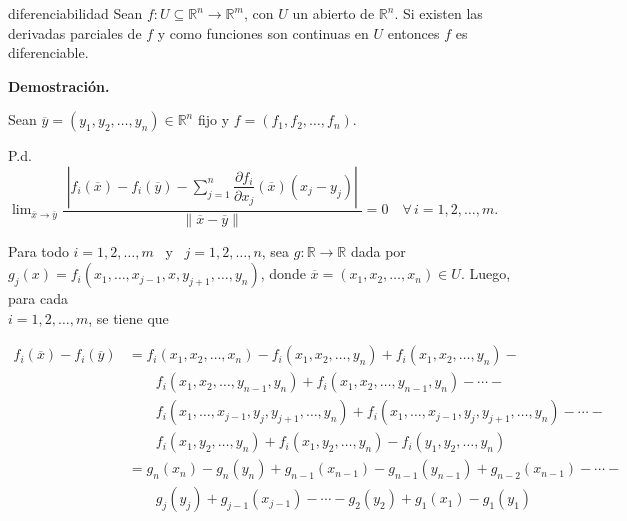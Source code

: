 \documentclass[12pt]{article}
\author{Osmar Dominique Santana Reyes}
\date{\today}
\newenvironment{ejercicio}[1]{\begin{ejer}[breakable, pad at break = 5mm, leftrule = 0.7mm, rightrule = 0.7mm, right = 2mm, left = 2mm, enlarge bottom finally by = 3mm, fontlower = \setlength{\parskip}{2mm}]{}{#1}}{\end{ejer}}
\newcommand{\real}{\mathbb{R}}
\begin{document}
	\begin{ejercicio}{diferenciabilidad}
		Sean $ f: U \subseteq \real^n \to \real^m $, con $ U $ un abierto de $ \real^n $. Si existen las derivadas parciales de $ f $ y como funciones son continuas en $ U $ entonces $ f $ es diferenciable.

		\tcblower

		\textbf{Demostración.} 

		Sean $ \overline{y} = \left( y_1, y_2, \ldots, y_n \right) \in \real^n $ fijo y $ f = \left( f_1, f_2, \ldots, f_n \right) $.

		P.d. $ \displaystyle \lim_{\overline{x} \to \overline{y}} \dfrac{ \phantom{|} \left\lvert f_i(\overline{x}) - f_i(\overline{y}) - \displaystyle \sum_{j=1}^{n} \dfrac{ \partial f_i }{ \partial x_j } (\overline{x}) \left( x_j - y_j \right) \right\rvert \phantom{|} }{ \left\lVert \overline{x} - \overline{y} \right\rVert } = 0 \quad \forall \, i = 1, 2, \ldots, m $.

		Para todo $ i = 1, 2, \ldots, m $ \, y \, $ j = 1, 2, \ldots, n $, sea $ g : \real \to \real $ dada por \\ $ g_j(x) = f_i\left( x_1, \ldots, x_{j-1}, x, y_{j+1}, \ldots, y_n \right) $, donde $ \overline{x} = \left( x_1, x_2, \ldots, x_n \right) \in U $. Luego, para cada \\ $ i = 1, 2, \ldots, m $, se tiene que 

		\begin{equation*}
			\begin{split}
				f_i(\overline{x}) - f_i(\overline{y}) &= f_i\left( x_1, x_2, \ldots, x_n \right) - f_i\left( x_1, x_2, \ldots, y_n \right) + f_i\left( x_1, x_2, \ldots, y_n \right) - \\
				& \qquad f_i\left( x_1, x_2, \ldots, y_{n-1}, y_n \right) + f_i\left( x_1, x_2, \ldots, y_{n-1}, y_n \right) - \cdots - \\
				& \qquad f_i\left( x_1, \ldots, x_{j-1}, y_j, y_{j+1}, \ldots, y_n \right) + f_i\left( x_1, \ldots, x_{j-1}, y_j, y_{j+1}, \ldots, y_n \right) - \cdots - \\
				& \qquad f_i\left( x_1, y_2, \ldots, y_n \right) + f_i\left( x_1, y_2, \ldots, y_n \right) - f_i\left( y_1, y_2, \ldots, y_n \right) \\
				&= g_n(x_n) - g_n(y_n) + g_{n-1}(x_{n-1}) - g_{n-1}(y_{n-1}) + g_{n-2}(x_{n-1}) - \cdots - \\
				& \qquad g_j(y_j) + g_{j-1}(x_{j-1}) - \cdots - g_2(y_2) + g_1(x_1) - g_1(y_1)
			\end{split}
		\end{equation*}


\end{ejercicio}
\end{document}
